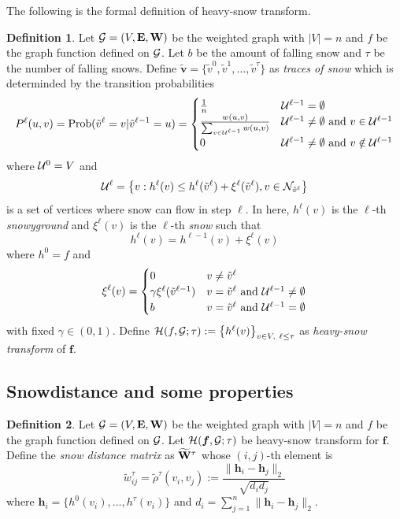 \documentclass[preprint, review, 12pt]{article}
\theoremstyle{definition}
\newtheorem{dfn}{Definition}
\theoremstyle{remark}
\begin{document}
The following is the formal definition of heavy-snow transform.
\begin{dfn}\label{snow:df_hst}
Let ${\cal G}=(V,{\bf E},{\bf W})$ be the weighted graph with $|V|=n$ and $f$ be the graph function defined on ${\cal G}$. Let $b$ be the amount of falling snow and $\tau$ be the number of falling snows. Define $\boldsymbol{\tilde v}=\{\tilde v^0,\tilde v^1,\dots ,\tilde v^{\tau}\}$ as \emph{traces of snow} which is determinded by the transition probabilities 
\[
P^{\ell}(u,v)=
\mbox{Prob}(\tilde v^{\ell}=v|\tilde v^{\ell-1}=u)
=\begin{cases}
\frac{1}{n}  & {\cal U}^{\ell-1}= \emptyset \\ 
\frac{w(u,v)}{\sum_{v\in {\cal U}^{\ell-1}} w(u,v)} & {\cal U}^{\ell-1}\neq \emptyset 
\mbox{ and } v \in {\cal U}^{\ell-1}\\ 
0 & {\cal U}^{\ell-1}\neq \emptyset \mbox{ and } v \notin {\cal U}^{\ell-1}
\end{cases}
\]
where ${\cal U}^0=V$ and 
\[
{\cal U}^{\ell}=\big\{v: h^{\ell}(v)\leq h^{\ell}(\tilde v^{\ell})+\xi^{\ell}(\tilde v^{\ell}), v\in {\cal N}_{\tilde v^{\ell}}\big\}
\]
is a set of vertices where snow can flow in step $\ell$. In here, $h^{\ell}(v)$ is the $\ell$-th \emph{snowyground} and $\xi^{\ell}(v)$ is the $\ell$-th \emph{snow} such that 
\[
h^{\ell}(v)=h^{\ell-1}(v)+\xi^{\ell}(v)
\]
where $h^{0}=f$ and 
\[
\xi^{\ell}(v)=	\begin{cases}
0 & v \neq  \tilde v^{\ell} \\
\gamma \xi^{\ell}(\tilde v^{\ell-1})  & v =  \tilde v^{\ell} \mbox{ and } {\cal U}^{\ell-1}\neq \emptyset \\
b &  v = \tilde v^{\ell} \mbox{ and } {\cal U}^{\ell-1} = \emptyset
\end{cases}
\]
with fixed $\gamma\in(0,1)$. 
Define ${\cal H}(f,{\cal G};\tau):=\big\{h^{\ell}(v)\big\}_{v \in V,~\ell \leq\tau }$ as \emph{heavy-snow transform} of ${\boldsymbol f}$. 
\end{dfn}

\subsection{Snowdistance and some properties} 
\begin{dfn}
Let ${\cal G}=(V,{\bf E},{\bf W})$ be the weighted graph with $|V|=n$ and $f$ be the graph function defined on ${\cal G}$. Let ${\cal H}({\boldsymbol f},{\cal G};\tau)$ be heavy-snow transform for ${\boldsymbol f}$. Define the \emph{snow distance matrix} as ${\widetilde{\bf W}}^{\tau}$ whose $(i,j)$-th element is 
\[
\tilde w^{\tau}_{ij}=\tilde \rho^{\tau}(v_i , v_j) := \frac{\|{\boldsymbol h}_i- {\boldsymbol h}_j\|_2 }{\sqrt{d_id_j}}
\]
where ${\boldsymbol h}_i=\{h^{0}(v_i),\dots,h^{\tau}(v_i)\}$ and $d_i=\sum_{j=1}^{n}\|{\boldsymbol h}_i- {\boldsymbol h}_j\|_2$. 
\end{dfn}
\end{document}
